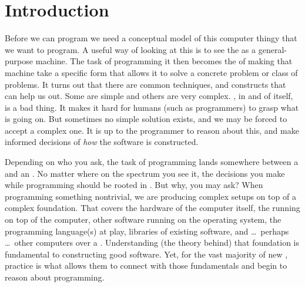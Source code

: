 \chapter{Introduction}
\label{sec:intro}

Before we can program we need a conceptual model of this computer thingy that we want to program. A useful way of looking at this is to see the  as a general-purpose machine. The task of programming it then becomes the  of making that machine take a specific form that allows it to solve a concrete problem or class of problems. It turns out that there are common techniques,  and constructs that can help us out. Some are simple and others are very complex. , in and of itself, is a bad thing. It makes it hard for humans (such as programmers) to grasp what is going on. But sometimes no simple solution exists, and we may be forced to accept a complex one. It is up to the programmer to reason about this, and make informed decisions of \textsl{how} the software is constructed.

Depending on who you ask, the task of programming lands somewhere between a  and an . No matter where on the spectrum you see it, the decisions you make while programming should be rooted in . But why, you may ask? When programming something nontrivial, we are producing complex setups on top of a complex foundation. That  covers the hardware of the computer itself, the  running on top of the computer, other software running on the operating system, the programming language(s) at play, libraries of existing software, and \ldots\ perhaps \ldots\ other computers over a . Understanding (the theory behind) that foundation is fundamental to constructing good software. Yet, for the vast majority of new , practice is what allows them to connect with those fundamentals and begin to reason about programming.

